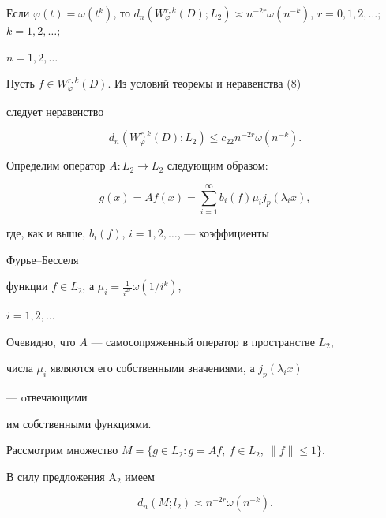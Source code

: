  


\begin{thm} 


Если $\varphi(t)=\omega(t^k)$, то $d_n(W^{r,k}_\varphi(D);L_2)\asymp 


n^{-2r}\omega(n^{-k})$, $r=0,1,2,\dotsc;$ $k=1,2,\dotsc;$ 


$n=1,2,\dotsc$ 


\end{thm} 


 


\begin{pf} 


Пусть $f\in W^{r,k}_\varphi(D)$. Из условий теоремы и неравенства (8) 


следует неравенство 


\begin{equation} 


d_n(W^{r,k}_\varphi(D);L_2)\le c_{22}n^{-2r}\omega(n^{-k}). 


\end{equation} 


 


Определим оператор $A:L_2\to L_2$ следующим образом: 


$$ 


g(x)=A f(x)=\sum^\infty_{i=1}b_i(f)\mu_i j_p(\lambda_i x), 


$$ 


где, как и выше, $b_i(f)$, $i=1,2,\dotsc$, --- коэффициенты 


Фурье--Бесселя 


функции $f\in L_2$, а $\mu_i=\frac{1}{i^{2r}}\omega(1/i^k)$, 


$i=1,2,\dotsc$ 


Очевидно, что $A$ --- самосопряженный оператор в пространстве $L_2$, 


числа $\mu_i$ являются его собственными значениями, а $j_p(\lambda_i x)$ 


--- oтвечающими 


им собственными функциями. 


 


Рассмотрим множество $M=\{g\in L_2:g=A f,\ f\in L_2,\ \|f\|\le1\}$. 


В силу предложения A$_2$ имеем 


\begin{equation} 


d_n(M;l_2)\asymp n^{-2r}\omega(n^{-k}). 



\end{equation}
\end{pf}
